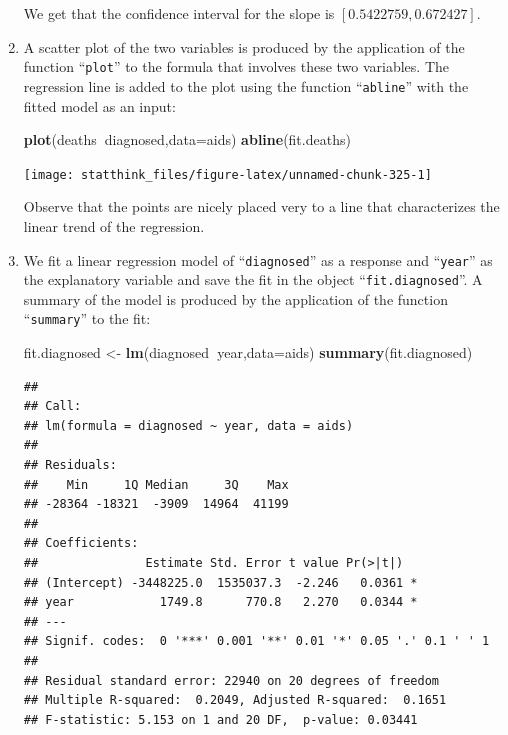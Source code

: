 \documentclass[
]{krantz}
\makeatletter
\newenvironment{Shaded}{\begin{snugshade}}{\end{snugshade}}
\newcommand{\DataTypeTok}[1]{\textcolor[rgb]{0.13,0.29,0.53}{#1}}
\newcommand{\KeywordTok}[1]{\textcolor[rgb]{0.13,0.29,0.53}{\textbf{#1}}}
\newcommand{\NormalTok}[1]{#1}
\newcommand{\OperatorTok}[1]{\textcolor[rgb]{0.81,0.36,0.00}{\textbf{#1}}}
\newcommand{\StringTok}[1]{\textcolor[rgb]{0.31,0.60,0.02}{#1}}
\newenvironment{kframe}{%
\medskip{}
\setlength{\fboxsep}{.8em}
 \def\at@end@of@kframe{}%
 \ifinner\ifhmode%
  \def\at@end@of@kframe{\end{minipage}}%
  \begin{minipage}{\columnwidth}%
 \fi\fi%
 \def\FrameCommand##1{\hskip\@totalleftmargin \hskip-\fboxsep
 \colorbox{shadecolor}{##1}\hskip-\fboxsep
     \hskip-\linewidth \hskip-\@totalleftmargin \hskip\columnwidth}%
 \MakeFramed {\advance\hsize-\width
   \@totalleftmargin\z@ \linewidth\hsize
   \@setminipage}}%
 {\par\unskip\endMakeFramed%
 \at@end@of@kframe}
\renewenvironment{Shaded}{\begin{kframe}}{\end{kframe}}
\theoremstyle{definition}
\theoremstyle{definition}
\theoremstyle{definition}
\theoremstyle{remark}
\makeatother
\begin{document}
\begin{enumerate}
  We get that the confidence interval for the slope is \([0.5422759 , 0.672427]\).
\item
  A scatter plot of the two
  variables is produced by the application of the function ``\texttt{plot}'' to the
  formula that involves these two variables. The regression line is added
  to the plot using the function ``\texttt{abline}'' with the fitted model as an
  input:

\begin{Shaded}
\begin{Highlighting}[]
\KeywordTok{plot}\NormalTok{(deaths}\OperatorTok{~}\NormalTok{diagnosed,}\DataTypeTok{data=}\NormalTok{aids)}
\KeywordTok{abline}\NormalTok{(fit.deaths)}
\end{Highlighting}
\end{Shaded}

  \begin{center}\texttt{[image: statthink\_files/figure-latex/unnamed-chunk-325-1]} \end{center}

  Observe that the points are nicely placed very to a line that
  characterizes the linear trend of the regression.
\item
  We fit a linear regression model
  of ``\texttt{diagnosed}'' as a response and ``\texttt{year}'' as the explanatory variable
  and save the fit in the object ``\texttt{fit.diagnosed}''. A summary of the model
  is produced by the application of the function ``\texttt{summary}'' to the fit:

\begin{Shaded}
\begin{Highlighting}[]
\NormalTok{fit.diagnosed <-}\StringTok{ }\KeywordTok{lm}\NormalTok{(diagnosed}\OperatorTok{~}\NormalTok{year,}\DataTypeTok{data=}\NormalTok{aids)}
\KeywordTok{summary}\NormalTok{(fit.diagnosed)}
\end{Highlighting}
\end{Shaded}

\begin{verbatim}
## 
## Call:
## lm(formula = diagnosed ~ year, data = aids)
## 
## Residuals:
##    Min     1Q Median     3Q    Max 
## -28364 -18321  -3909  14964  41199 
## 
## Coefficients:
##               Estimate Std. Error t value Pr(>|t|)  
## (Intercept) -3448225.0  1535037.3  -2.246   0.0361 *
## year            1749.8      770.8   2.270   0.0344 *
## ---
## Signif. codes:  0 '***' 0.001 '**' 0.01 '*' 0.05 '.' 0.1 ' ' 1
## 
## Residual standard error: 22940 on 20 degrees of freedom
## Multiple R-squared:  0.2049, Adjusted R-squared:  0.1651 
## F-statistic: 5.153 on 1 and 20 DF,  p-value: 0.03441
\end{verbatim}


\end{enumerate}
\end{document}
